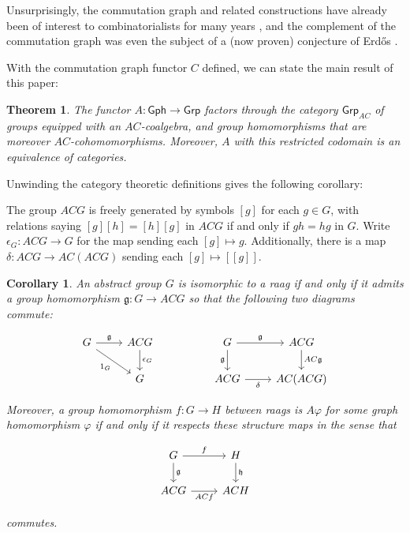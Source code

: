 \documentclass[12pt]{article}
\newtheorem*{thm*}{Theorem}
\newtheorem*{cor*}{Corollary}
\theoremstyle{definition}
\theoremstyle{theorem}
\begin{document}
  Unsurprisingly, the commutation graph and related constructions have already 
  been of interest to combinatorialists for many years 
  \cite{baumeisterCommutingGraphsOdd2009,
  dolinarMaximalDistancesCommuting2012,
  giudiciDiametersCommutingGraphs2010,
  arvindRecognizingCommutingGraph2022,
  cameronGraphsDefinedGroups2022}, and the complement of the commutation 
  graph was even the subject of a (now proven) conjecture of Erd\H{o}s
  \cite{neumannProblemPaulErdos1976}.

  With the commutation graph functor $C$ defined, we can state the main result
  of this paper:

  \begin{thm*}
    The functor $A : \mathsf{Gph} \to \mathsf{Grp}$ factors through 
    the category $\mathsf{Grp}_{AC}$ of groups equipped with an $AC$-coalgebra,
    and group homomorphisms that are moreover $AC$-cohomomorphisms. Moreover,
    $A$ with this restricted codomain is an equivalence of categories.
  \end{thm*}

  Unwinding the category theoretic definitions gives the following corollary:

  The group $ACG$ is freely generated by symbols $[g]$ for each $g \in G$, 
  with relations saying $[g][h] = [h][g]$ in $ACG$ if and only if $gh = hg$ in $G$. 
  Write $\epsilon_G : ACG \to G$ for the map sending each $[g] \mapsto g$.
  Additionally, there is a map $\delta : ACG \to AC(ACG)$ sending each 
  $[g] \mapsto [[g]]$.

  \begin{cor*}
    An abstract group $G$ is isomorphic to a raag if and only if it admits a 
    group homomorphism $\mathfrak{g} : G \to ACG$ so that the following two 
    diagrams commute:

    \[
        \begin{tikzcd}
        G & ACG && G   & ACG \\
          & G   && ACG & AC(ACG)
        \arrow["\mathfrak{g}", from=1-1, to=1-2]
        \arrow["{\epsilon_G}", from=1-2, to=2-2]
        \arrow["{1_G}"', from=1-1, to=2-2]
        \arrow["\mathfrak{g}"', from=1-4, to=2-4]
        \arrow["\mathfrak{g}", from=1-4, to=1-5]
        \arrow["\delta"', from=2-4, to=2-5]
        \arrow["AC\mathfrak{g}", from=1-5, to=2-5]
        \end{tikzcd}
    \]

    Moreover, a group homomorphism $f : G \to H$ between raags is 
    $A \varphi$ for some graph homomorphism $\varphi$ if and only if it 
    respects these structure maps in the sense that 

    \[
        \begin{tikzcd}
        G & H \\
        ACG & ACH
        \arrow["\mathfrak{g}", from=1-1, to=2-1]
        \arrow["\mathfrak{h}", from=1-2, to=2-2]
        \arrow["f", from=1-1, to=1-2]
        \arrow["ACf"', from=2-1, to=2-2]
        \end{tikzcd}
    \]    

    commutes.
  \end{cor*}
\end{document}
